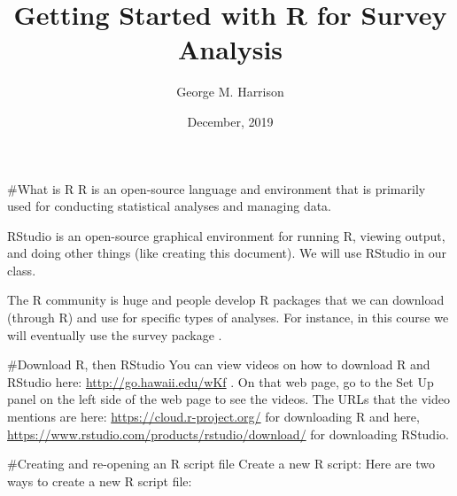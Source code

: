 \documentclass[]{tufte-handout}
\title{Getting Started with R for Survey Analysis}
\author{George M. Harrison}
\date{December, 2019}
\begin{document}
\maketitle



{
\setcounter{tocdepth}{2}
\tableofcontents
}

\#What is R R \citep{R-base} is an open-source language and environment
that is primarily used for conducting statistical analyses and managing
data.

RStudio \citep{RStudio} is an open-source graphical environment for
running R, viewing output, and doing other things (like creating this
document). We will use RStudio in our class.

The R community is huge and people develop R packages that we can
download (through R) and use for specific types of analyses. For
instance, in this course we will eventually use the survey package
\citep{survey-package}.

\#Download R, then RStudio You can view videos on how to download R and
RStudio here: \url{http://go.hawaii.edu/wKf} . On that web page, go to
the Set Up panel on the left side of the web page to see the videos. The
URLs that the video mentions are here:
\url{https://cloud.r-project.org/} for downloading R and here,
\url{https://www.rstudio.com/products/rstudio/download/} for downloading
RStudio.

\#Creating and re-opening an R script file Create a new R script: Here
are two ways to create a new R script file:
\end{document}
